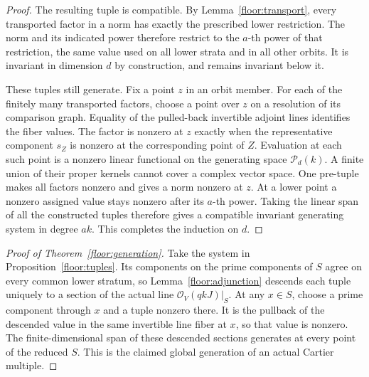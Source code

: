 \begin{proof}
The resulting tuple is compatible.  By Lemma~\ref{floor:transport},
every transported factor in a norm has exactly the prescribed lower
restriction.  The norm and its indicated power therefore restrict to
the \(a\)-th power of that restriction, the same value used on all lower
strata and in all other orbits.  It is invariant in dimension \(d\) by
construction, and remains invariant below it.

These tuples still generate.  Fix a point \(z\) in an orbit member.
For each of the finitely many transported factors, choose a point over
\(z\) on a resolution of its comparison graph.  Equality of the
pulled-back invertible adjoint lines identifies the fiber values.  The
factor is nonzero at \(z\) exactly when the representative component
\(s_Z\) is nonzero at the corresponding point of \(Z\).  Evaluation at each
such point is a nonzero linear functional on the generating space
\(\mathcal P_d(k)\).
A finite union of their proper kernels cannot cover a complex vector
space.  One pre-tuple makes all factors nonzero and gives a norm nonzero
at \(z\).  At a lower point a nonzero assigned value stays nonzero after
its \(a\)-th power.  Taking the linear span of all the constructed tuples
therefore gives a compatible invariant generating system in degree \(ak\).
This completes the induction on \(d\).
\end{proof}

\begin{proof}[Proof of Theorem~\ref{floor:generation}]
Take the system in Proposition~\ref{floor:tuples}.  Its components on the
prime components of \(S\) agree on every common lower stratum, so
Lemma~\ref{floor:adjunction} descends each tuple uniquely to a section of
the actual line \(\mathcal O_V(qkJ)|_S\).  At any \(x\in S\), choose a
prime component through \(x\) and a tuple nonzero there.  It is the pullback
of the descended value in the same invertible line fiber at \(x\), so
that value is nonzero.  The finite-dimensional span of these descended
sections generates at every point of the reduced \(S\).  This is the
claimed global generation of an actual Cartier multiple.
\end{proof}
